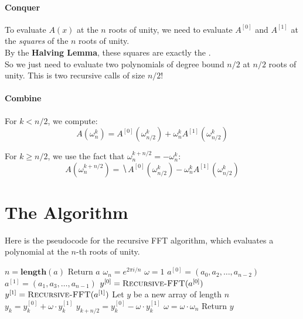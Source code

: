 \documentclass[11  pt]{article}
\begin{document}
\paragraph{Conquer}
To evaluate $A(x)$ at the $n$ roots of unity, we need to evaluate $A^{[0]}$ and $A^{[1]}$ at the \emph{squares} of the $n$ roots of unity. \\

By the \textbf{Halving Lemma}, these squares are exactly the . \\

So we just need to evaluate two polynomials of degree bound $n/2$ at $n/2$ roots of unity. This is two recursive calls of size $n/2$!

\paragraph{Combine}
For $k < n/2$, we compute:
\begin{equation*}
    A(\omega_n^k) = A^{[0]}(\omega_{n/2}^k) + \omega_n^k A^{[1]}(\omega_{n/2}^k)
\end{equation*}

For $k \geq n/2$, we use the fact that $\omega_n^{k + n/2} = -\omega_n^k$:
\begin{equation*}
    A(\omega_n^{k + n/2}) = \hide{A^{[0]}(\omega_{n/2}^k) - \omega_n^k A^{[1]}(\omega_{n/2}^k)}
\end{equation*}

\vs{2cm}

\newpage
\section{The Algorithm}

Here is the pseudocode for the recursive FFT algorithm, which evaluates a polynomial at the $n$-th roots of unity.

\begin{algorithm}
    \caption{Recursive-FFT($a$)}
    \begin{algorithmic}
        \State $n = \textbf{length}(a)$
        \State Return $a$
        \EndIf
        \State $\omega_n = e^{2\pi i / n}$
        \State $\omega = 1$
        \State $a^{[0]} = (a_0, a_2, \hdots, a_{n-2})$
        \State $a^{[1]} = (a_1, a_3, \hdots, a_{n-1})$
        \State $y^{[0]} = \textsc{Recursive-FFT}(a^{[0]})$
        \State $y^{[1]} = \textsc{Recursive-FFT}(a^{[1]})$
        \State Let $y$ be a new array of length $n$
            \State $y_k = y^{[0]}_k + \omega \cdot y^{[1]}_k$
            \State $y_{k + n/2} = y^{[0]}_k - \omega \cdot y^{[1]}_k$
            \State $\omega = \omega \cdot \omega_n$
        \EndFor
        \State Return $y$
    \end{algorithmic}
\end{algorithm}
\end{document}
